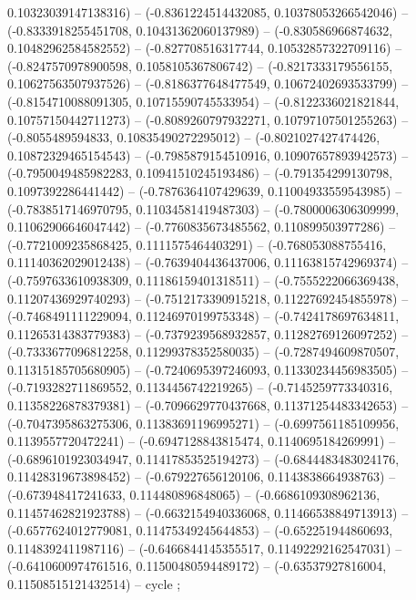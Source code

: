 0.10323039147138316) -- (-0.8361224514432085, 0.10378053266542046) -- (-0.8333918255451708, 0.10431362060137989) -- (-0.830586966874632, 0.10482962584582552) -- (-0.827708516317744, 0.10532857322709116) -- (-0.8247570978900598, 0.1058105367806742) -- (-0.8217333179556155, 0.10627563507937526) -- (-0.8186377648477549, 0.10672402693533799) -- (-0.8154710088091305, 0.10715590745533954) -- (-0.8122336021821844, 0.10757150442711273) -- (-0.8089260797932271, 0.10797107501255263) -- (-0.8055489594833, 0.10835490272295012) -- (-0.8021027427474426, 0.10872329465154543) -- (-0.7985879154510916, 0.10907657893942573) -- (-0.7950049485982283, 0.10941510245193486) -- (-0.791354299130798, 0.1097392286441442) -- (-0.7876364107429639, 0.11004933559543985) -- (-0.7838517146970795, 0.11034581419487303) -- (-0.7800006306309999, 0.11062906646047442) -- (-0.7760835673485562, 0.110899503977286) -- (-0.7721009235868425, 0.1111575464403291) -- (-0.768053088755416, 0.11140362029012438) -- (-0.7639404436437006, 0.11163815742969374) -- (-0.7597633610938309, 0.11186159401318511) -- (-0.7555222066369438, 0.11207436929740293) -- (-0.7512173390915218, 0.11227692454855978) -- (-0.7468491111229094, 0.11246970199753348) -- (-0.7424178697634811, 0.11265314383779383) -- (-0.7379239568932857, 0.11282769126097252) -- (-0.7333677096812258, 0.11299378352580035) -- (-0.7287494609870507, 0.11315185705680905) -- (-0.7240695397246093, 0.11330234456983505) -- (-0.7193282711869552, 0.1134456742219265) -- (-0.7145259773340316, 0.11358226878379381) -- (-0.7096629770437668, 0.11371254483342653) -- (-0.7047395863275306, 0.11383691196995271) -- (-0.6997561185109956, 0.1139557720472241) -- (-0.6947128843815474, 0.1140695184269991) -- (-0.6896101923034947, 0.11417853525194273) -- (-0.6844483483024176, 0.11428319673898452) -- (-0.679227656120106, 0.1143838664938763) -- (-0.673948417241633, 0.114480896848065) -- (-0.6686109308962136, 0.11457462821923788) -- (-0.6632154940336068, 0.11466538849713913) -- (-0.6577624012779081, 0.11475349245644853) -- (-0.652251944860693, 0.1148392411987116) -- (-0.6466844145355517, 0.11492292162547031) -- (-0.6410600974761516, 0.11500480594489172) -- (-0.63537927816004, 0.11508515121432514) -- cycle
;